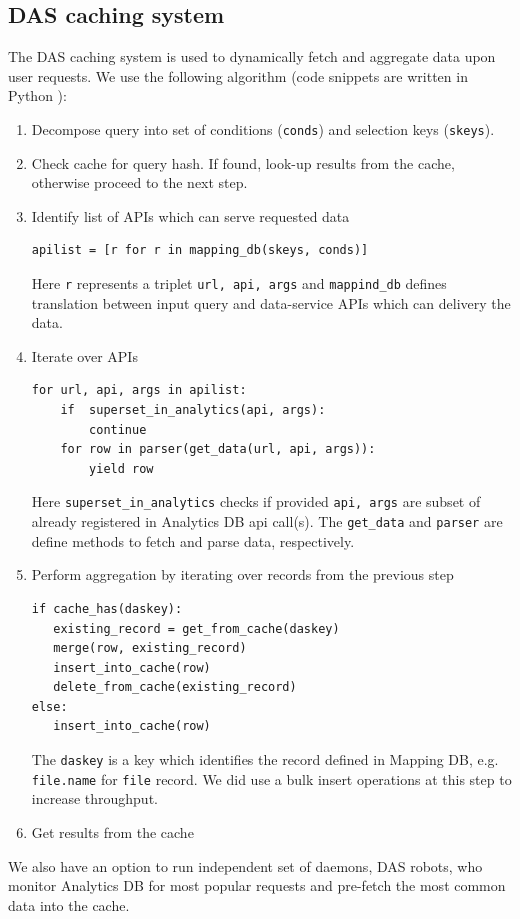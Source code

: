 \documentclass[1p,times]{elsarticle}
\begin{document}

\subsection{DAS caching system}
The DAS caching system is used to dynamically fetch
and aggregate data upon user requests. We use the following 
algorithm (code snippets are written in Python \cite{Python}):
\begin{enumerate}[1.]
\item Decompose query into set of conditions (\verb+conds+) 
and selection keys (\verb+skeys+).
\item Check cache for query hash. If found, look-up results from the cache,
otherwise proceed to the next step.
\item Identify list of APIs which can serve requested data
\begin{verbatim}
apilist = [r for r in mapping_db(skeys, conds)]
\end{verbatim}
Here \verb+r+ represents a triplet \verb+url, api, args+ and 
\verb+mappind_db+ defines translation between input query and data-service
APIs which can delivery the data.
\item Iterate over APIs
\begin{verbatim}
for url, api, args in apilist:
    if  superset_in_analytics(api, args):
        continue
    for row in parser(get_data(url, api, args)):
        yield row
\end{verbatim}
Here \verb+superset_in_analytics+ checks if provided \verb+api, args+
are subset of already registered in Analytics DB api call(s). The 
\verb+get_data+ and \verb+parser+ are define methods to fetch and parse
data, respectively.
\item Perform aggregation by iterating over records from the previous step
\begin{verbatim}
if cache_has(daskey):
   existing_record = get_from_cache(daskey)
   merge(row, existing_record)
   insert_into_cache(row)
   delete_from_cache(existing_record)
else:
   insert_into_cache(row)
\end{verbatim}
The \verb+daskey+
is a key which identifies the record defined in Mapping DB, e.g. \verb+file.name+
for \verb+file+ record.
We did use a bulk insert operations at this step to increase throughput. 
\item Get results from the cache
\end{enumerate}
We also have an option to run independent set of daemons, DAS robots, who
monitor Analytics DB for most popular requests and pre-fetch the most
common data into the cache. 
\end{document}
